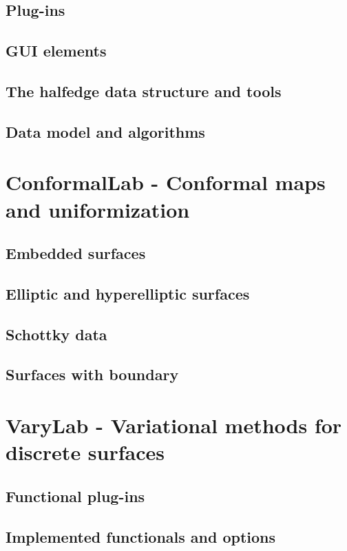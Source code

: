 \label{sec:jrworkspace}
\subsection{Plug-ins}
\subsection{GUI elements}
\subsection{The halfedge data structure and tools}
\subsection{Data model and algorithms}



\section{{\sc ConformalLab} - Conformal maps and uniformization}
\label{sec:conformallab}
\subsection{Embedded surfaces}
\subsection{Elliptic and hyperelliptic surfaces}
\subsection{Schottky data}
\subsection{Surfaces with boundary}

\section{{\sc VaryLab} - Variational methods for discrete surfaces}
\label{sec:varylab}
\subsection{Functional plug-ins}
\subsection{Implemented functionals and options}
